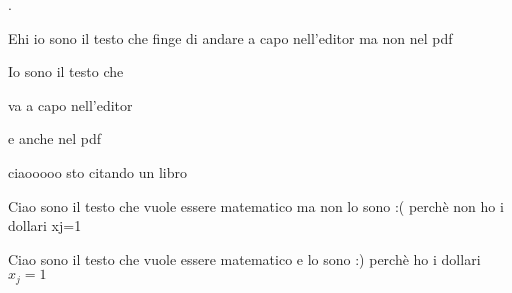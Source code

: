 .

Ehi io sono il testo che
finge di andare a capo nell'editor ma non nel pdf 

\vspace{2cm}

Io sono il testo che

va a capo nell'editor 

e anche nel pdf 

\vspace{2cm}
ciaooooo sto citando un libro \cite{eco2017come}

\vspace{2cm}
Ciao sono il testo che vuole essere matematico ma non lo sono :( perchè non ho i dollari xj=1

Ciao sono il testo che vuole essere matematico e lo sono :) perchè ho i dollari  $x_j=1$





